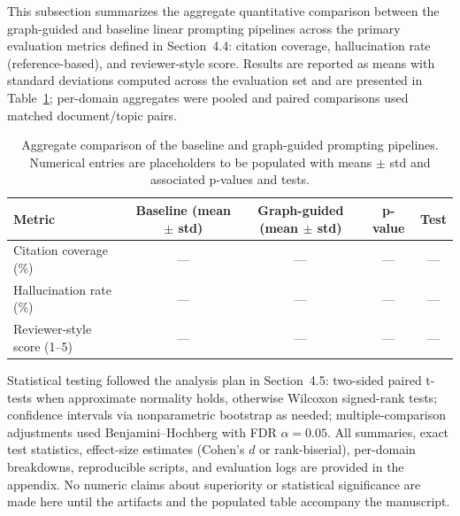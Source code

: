 This subsection summarizes the aggregate quantitative comparison between the graph-guided and baseline linear prompting pipelines across the primary evaluation metrics defined in Section~4.4: citation coverage, hallucination rate (reference-based), and reviewer-style score.
Results are reported as means with standard deviations computed across the evaluation set and are presented in Table~\ref{tab:aggregate-results}; per-domain aggregates were pooled and paired comparisons used matched document/topic pairs.

\begin{table}[t]
\centering\small\begin{tabular}{lcccc}\toprule
Metric & Baseline (mean $\pm$ std) & Graph-guided (mean $\pm$ std) & p-value & Test \\ \midrule
Citation coverage (\%) & --- & --- & --- & --- \\ Hallucination rate (\%) & --- & --- & --- & --- \\ Reviewer-style score (1--5) & --- & --- & --- & --- \\ \bottomrule
\end{tabular}
\caption{Aggregate comparison of the baseline and graph-guided prompting pipelines. Numerical entries are placeholders to be populated with means $\pm$ std and associated p-values and tests.}\label{tab:aggregate-results}
\end{table}

Statistical testing followed the analysis plan in Section~4.5: two-sided paired t-tests when approximate normality holds, otherwise Wilcoxon signed-rank tests; confidence intervals via nonparametric bootstrap as needed; multiple-comparison adjustments used Benjamini--Hochberg with FDR $\alpha=0.05$.
All summaries, exact test statistics, effect-size estimates (Cohen's $d$ or rank-biserial), per-domain breakdowns, reproducible scripts, and evaluation logs are provided in the appendix. No numeric claims about superiority or statistical significance are made here until the artifacts and the populated table accompany the manuscript.